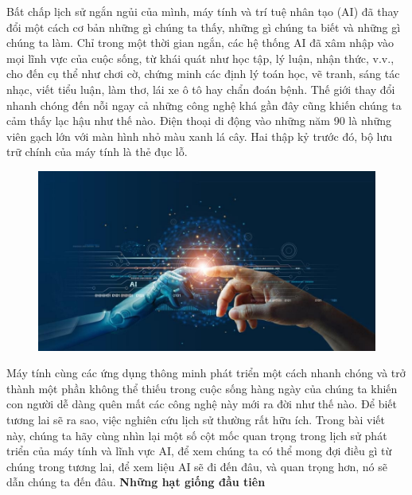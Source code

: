 \begin{multicols}{2}
	Bất chấp lịch sử ngắn ngủi của mình, máy tính và trí tuệ nhân tạo (AI) đã thay đổi một cách cơ bản những gì chúng ta thấy, những gì chúng ta biết và những gì chúng ta làm. Chỉ trong một thời gian ngắn, các hệ thống AI đã xâm nhập vào mọi lĩnh vực của cuộc sống, từ khái quát như học tập, lý luận, nhận thức, v.v., cho đến cụ thể như chơi cờ, chứng minh các định lý toán học, vẽ tranh, sáng tác nhạc, viết tiểu luận, làm thơ, lái xe ô tô hay chẩn đoán bệnh. Thế giới thay đổi nhanh chóng đến nỗi ngay cả những công nghệ khá gần đây cũng khiến chúng ta cảm thấy lạc hậu như thế nào. Điện thoại di động vào những năm 90 là những viên gạch lớn với màn hình nhỏ màu xanh lá cây. Hai thập kỷ trước đó, bộ lưu trữ chính của máy tính là thẻ đục lỗ.
	\begin{figure}[H]
		\vspace*{-5pt}
		\centering
		\captionsetup{labelformat= empty, justification=centering}
		\includegraphics[width= 1\linewidth]{AI1.jpg}
		\vspace*{-15pt}
	\end{figure}
	Máy tính cùng các ứng dụng thông minh phát triển một cách nhanh chóng và trở thành một phần không thể thiếu trong cuộc sống hàng ngày của chúng ta khiến con người dễ dàng quên mất các công nghệ này mới ra đời như thế nào. Để biết tương lai sẽ ra sao, việc nghiên cứu lịch sử thường rất hữu ích. Trong bài viết này, chúng ta hãy cùng nhìn lại một số cột mốc quan trọng trong lịch sử phát triển của máy tính và lĩnh vực AI, để xem chúng ta có thể mong đợi điều gì từ chúng trong tương lai, để xem liệu AI sẽ đi đến đâu, và quan trọng hơn, nó sẽ dẫn chúng ta đến đâu.
	\vskip 0.1cm
	\textbf{\color{cackithi}Những hạt giống đầu tiên}
	\vskip 0.1cm

\end{multicols}
